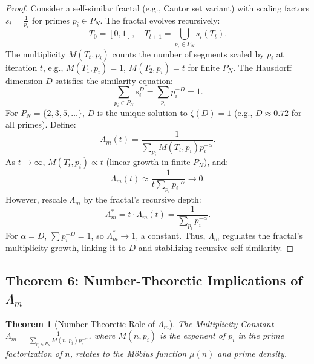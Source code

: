 \documentclass{article}
\theoremstyle{plain}
\newtheorem{theorem}{Theorem}
\begin{document}
\begin{proof}
Consider a self-similar fractal (e.g., Cantor set variant) with scaling factors \( s_i = \frac{1}{p_i} \) for primes \( p_i \in P_N \). The fractal evolves recursively:
\[
T_0 = [0, 1], \quad T_{t+1} = \bigcup_{p_i \in P_N} s_i(T_t).
\]
The multiplicity \( M(T_t, p_i) \) counts the number of segments scaled by \( p_i \) at iteration \( t \), e.g., \( M(T_1, p_i) = 1 \), \( M(T_2, p_i) = t \) for finite \( P_N \). The Hausdorff dimension \( D \) satisfies the similarity equation:
\[
\sum_{p_i \in P_N} s_i^D = \sum_{p_i} p_i^{-D} = 1.
\]
For \( P_N = \{2, 3, 5, \ldots\} \), \( D \) is the unique solution to \(\zeta(D) = 1\) (e.g., \( D \approx 0.72 \) for all primes). Define:
\[
\Lambda_m(t) = \frac{1}{\sum_{p_i} M(T_t, p_i) p_i^{-\alpha}}.
\]
As \( t \to \infty \), \( M(T_t, p_i) \propto t \) (linear growth in finite \( P_N \)), and:
\[
\Lambda_m(t) \approx \frac{1}{t \sum_{p_i} p_i^{-\alpha}} \to 0.
\]
However, rescale \(\Lambda_m\) by the fractal’s recursive depth:
\[
\Lambda_m^* = t \cdot \Lambda_m(t) = \frac{1}{\sum_{p_i} p_i^{-\alpha}}.
\]
For \(\alpha = D\), \(\sum p_i^{-D} = 1\), so \(\Lambda_m^* \to 1\), a constant. Thus, \(\Lambda_m\) regulates the fractal’s multiplicity growth, linking it to \( D \) and stabilizing recursive self-similarity.
\end{proof}

\subsection{Theorem 6: Number-Theoretic Implications of \(\Lambda_m\)}
\begin{theorem}[Number-Theoretic Role of \(\Lambda_m\)]
The Multiplicity Constant \(\Lambda_m = \frac{1}{\sum_{p_i \in P_N} M(n, p_i) p_i^{-\alpha}}\), where \( M(n, p_i) \) is the exponent of \( p_i \) in the prime factorization of \( n \), relates to the M\"{o}bius function \(\mu(n)\) and prime density.
\end{theorem}
\end{document}
